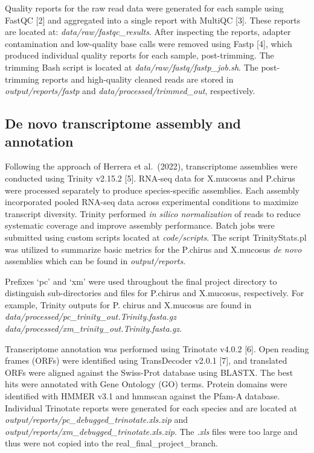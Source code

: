 \documentclass[12pt,]{article}
\begin{document}
Quality reports for the raw read data were generated for each sample
using FastQC {[}2{]} and aggregated into a single report with MultiQC
{[}3{]}. These reports are located at: \emph{data/raw/fastqc\_results}.
After inspecting the reports, adapter contamination and low-quality base
calls were removed using Fastp {[}4{]}, which produced individual
quality reports for each sample, post-trimming. The trimming Bash script
is located at \emph{data/raw/fastq/fastp\_job.sh}. The post-trimming
reports and high-quality cleaned reads are stored in
\emph{output/reports/fastp} and \emph{data/processed/trimmed\_out},
respectively.

\subsection{De novo transcriptome assembly and
annotation}\label{de-novo-transcriptome-assembly-and-annotation}

Following the approach of Herrera et al.~(2022), transcriptome
assemblies were conducted using Trinity v2.15.2 {[}5{]}. RNA-seq data
for X.mucosus and P.chirus were processed separately to produce
species-specific assemblies. Each assembly incorporated pooled RNA-seq
data across experimental conditions to maximize transcript diversity.
Trinity performed \emph{in silico normalization} of reads to reduce
systematic coverage and improve assembly performance. Batch jobs were
submitted using custom scripts located at \emph{code/scripts}. The
script TrinityStats.pl was utilized to summarize basic metrics for the
P.chirus and X.mucosus \emph{de novo} assemblies which can be found in
\emph{output/reports}.

Prefixes `pc' and `xm' were used throughout the final project directory
to distinguish sub-directories and files for P.chirus and X.mucosus,
respectively. For example, Trinity outputs for P. chirus and X.mucosus
are found in \emph{data/processed/pc\_trinity\_out.Trinity.fasta.gz}
\emph{data/processed/xm\_trinity\_out.Trinity.fasta.gz}.

Transcriptome annotation was performed using Trinotate v4.0.2 {[}6{]}.
Open reading frames (ORFs) were identified using TransDecoder v2.0.1
{[}7{]}, and translated ORFs were aligned against the Swiss-Prot
database using BLASTX. The best hits were annotated with Gene Ontology
(GO) terms. Protein domains were identified with HMMER v3.1 and hmmscan
against the Pfam-A database. Individual Trinotate reports were generated
for each species and are located at
\emph{output/reports/pc\_debugged\_trinotate.xls.zip} and
\emph{output/reports/xm\_debugged\_trinotate.xls.zip}. The \emph{.xls}
files were too large and thus were not copied into the
real\_final\_project\_branch.
\end{document}
